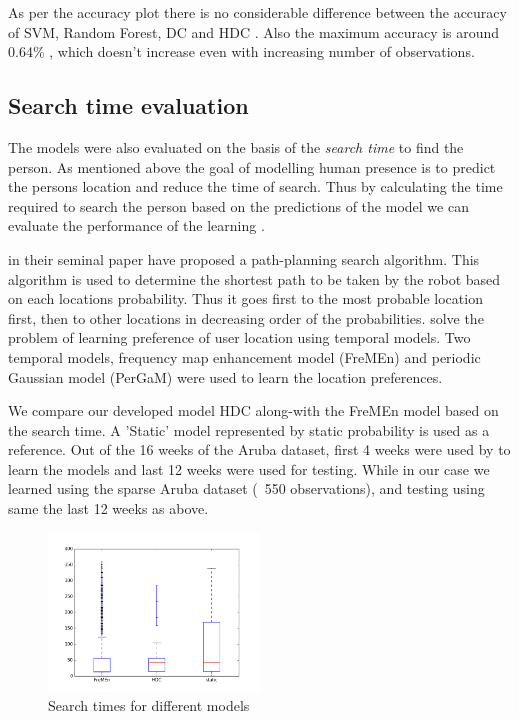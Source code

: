 As per the accuracy plot there is no considerable difference between the accuracy of  SVM, Random Forest, DC and HDC . Also the maximum accuracy is around 0.64\% , which doesn’t increase even with increasing number of observations. 


\subsection{Search time evaluation}
The models were also evaluated on the basis of the \emph{search time} to find the person. As mentioned above the goal of modelling human presence is to predict the persons location and reduce the time of search. Thus by calculating the time required to search the person based on the predictions of the model we can evaluate the performance of the learning \citep{krajnik_wheres_2015}.

\cite{krajnik_wheres_2015} in their seminal paper have proposed a path-planning search algorithm. This algorithm is used to determine the shortest path to be taken by the robot based on each locations probability. Thus it goes first to the most probable location first, then to other locations in decreasing order of the probabilities. \cite{krajnik_wheres_2015} solve the problem of learning preference of user location using temporal models. Two temporal models, frequency map enhancement  model  (FreMEn) and periodic Gaussian model (PerGaM) were used to learn the location preferences. 

We compare our developed model HDC along-with the FreMEn model based on the search time. A 'Static' model represented by static probability is used as a reference. Out of the 16 weeks of the Aruba dataset, first 4 weeks were used by \cite{krajnik_wheres_2015} to learn the models and last 12 weeks were used for testing. While in our case we learned using the sparse Aruba dataset  (~550 observations), and testing using same the last 12 weeks as above.

\begin{figure}[htp]
\centering
\includegraphics[width=0.5\textwidth]{images/box_plot_fremen_hdc.png}
\caption[Search time evaluation]{Search times for different models}
\label{fig:search_time}
\end{figure}


